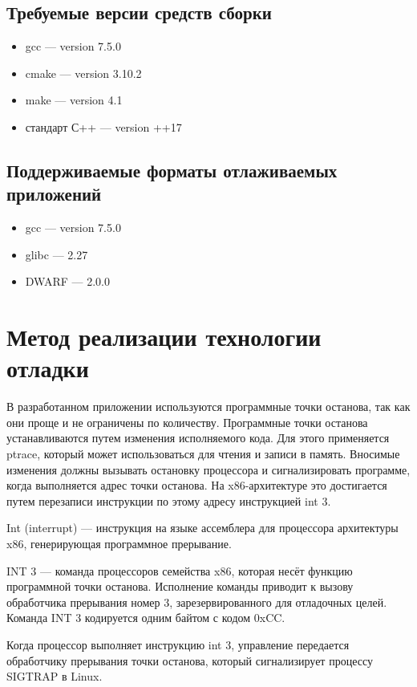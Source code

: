 \documentclass[oneside,final,14pt]{extreport}
\begin{document}
\subsection{Требуемые версии средств сборки}
	\begin{itemize}
	\item gcc --- version 7.5.0 
	\item cmake ---  version 3.10.2
	\item make --- version 4.1
	\item стандарт С++ ---  version ++17
\end{itemize}
\subsection{Поддерживаемые форматы отлаживаемых приложений}
	\begin{itemize}
	\item gcc --- version 7.5.0 
	\item glibc --- 2.27
	\item  DWARF  --- 2.0.0
\end{itemize}

\section{Метод реализации технологии отладки}
В разработанном приложении используются программные точки останова, так как они проще и не ограничены по количеству. Программные точки останова устанавливаются путем изменения исполняемого кода. Для этого применяется ptrace, который может использоваться для чтения и записи в память. Вносимые изменения должны вызывать остановку процессора и сигнализировать программе, когда выполняется адрес точки останова. На x86-архитектуре это достигается путем перезаписи инструкции по этому адресу инструкцией int 3.

Int (interrupt) — инструкция на языке ассемблера для процессора архитектуры x86, генерирующая программное прерывание.

INT 3 — команда процессоров семейства x86, которая несёт функцию программной точки останова. Исполнение команды приводит к вызову обработчика прерывания номер 3, зарезервированного для отладочных целей. Команда INT 3 кодируется одним байтом с кодом 0xCC.

Когда процессор выполняет инструкцию int 3, управление передается обработчику прерывания точки останова, который сигнализирует процессу SIGTRAP в Linux.
\end{document}
